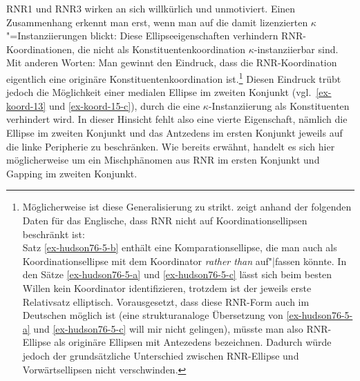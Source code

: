 RNR1 und RNR3 wirken an sich willkürlich und unmotiviert. Einen Zusammenhang erkennt man erst, wenn man auf die damit lizenzierten $\kappa$"=Instanziierungen blickt: Diese Ellipseeigenschaften verhindern RNR-Koordinationen, die nicht als Konstituentenkoordination $\kappa$-instanziierbar sind. Mit anderen Worten: Man gewinnt den Eindruck, dass die RNR-Koordina\-tion eigentlich eine originäre Konstituentenkoordination ist.\footnote{Möglicherweise ist diese Generalisierung zu strikt. \cite{Hudson:76} zeigt anhand der folgenden Daten für das Englische, dass RNR nicht auf Koordinationsellipsen beschränkt ist:\\
Satz \ref{ex-hudson76-5-b} enthält eine Komparationsellipse, die man auch als Koordinationsellipse mit dem Koordinator {\it rather than} auf"|fassen könnte. In den Sätze \ref{ex-hudson76-5-a} und \ref{ex-hudson76-5-c} lässt sich beim besten Willen kein Koordinator identifizieren, trotzdem ist der jeweils erste Relativsatz elliptisch. Vorausgesetzt, dass diese RNR-Form auch im Deutschen möglich ist (eine strukturanaloge Übersetzung von \ref{ex-hudson76-5-a} und \ref{ex-hudson76-5-c} will mir nicht gelingen), müsste man also RNR-Ellipse als originäre Ellipsen mit Antezedens bezeichnen. Dadurch würde jedoch der grundsätzliche Unterschied zwischen RNR-Ellipse und Vorwärtsellipsen nicht verschwinden.} Diesen Eindruck trübt jedoch die Möglichkeit einer medialen Ellipse im zweiten Konjunkt (vgl.\ \ref{ex-koord-13} und \ref{ex-koord-15-c}), durch die eine $\kappa$-Instanziierung als Konstituenten verhindert wird. In dieser Hinsicht fehlt also eine vierte Eigenschaft, nämlich die Ellipse im zweiten Konjunkt und das Antzedens im ersten Konjunkt jeweils auf die linke Peripherie zu beschränken. Wie bereits erwähnt, handelt es sich hier möglicherweise um ein Mischphänomen aus RNR im ersten Konjunkt und Gapping im zweiten Konjunkt.





